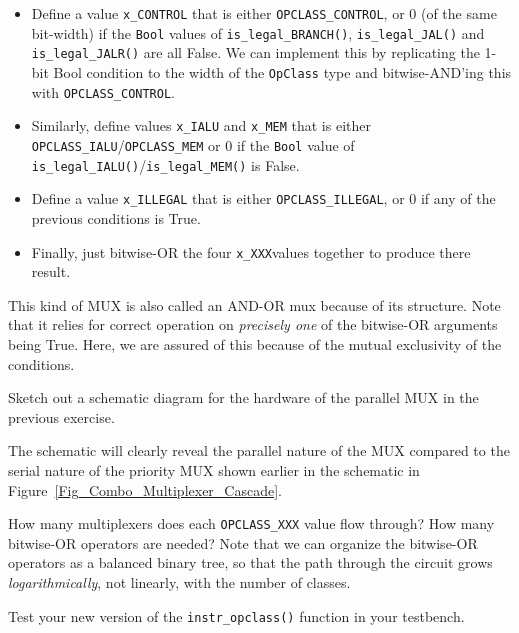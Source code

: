   \begin{itemize}

    \item Define a value \verb|x_CONTROL| that is either
      \verb|OPCLASS_CONTROL|, or 0 (of the same bit-width) if the
      \verb|Bool| values of \verb|is_legal_BRANCH()|,
      \verb|is_legal_JAL()| and \verb|is_legal_JALR()| are all False.
      We can implement this by replicating the 1-bit Bool condition to
      the width of the \verb|OpClass| type and bitwise-AND'ing this
      with \verb|OPCLASS_CONTROL|.

    \item Similarly, define values \verb|x_IALU| and \verb|x_MEM| that
       is either \verb|OPCLASS_IALU|/\verb|OPCLASS_MEM| or 0 if the
       \verb|Bool| value of
       \verb|is_legal_IALU()|/\verb|is_legal_MEM()| is False.

    \item Define a value \verb|x_ILLEGAL| that is either
      \verb|OPCLASS_ILLEGAL|, or 0 if any of
      the previous conditions is True.

    \item Finally, just bitwise-OR the four \verb|x_XXX|values
      together to produce there result.

  \end{itemize}

  This kind of MUX is also called an AND-OR mux because of its
  structure.  Note that it relies for correct operation on
  \emph{precisely one} of the bitwise-OR arguments being True.  Here,
  we are assured of this because of the mutual exclusivity of the
  conditions.

\Exercise

Sketch out a schematic diagram for the hardware of the parallel MUX in
the previous exercise.

The schematic will clearly reveal the parallel nature of the MUX
compared to the serial nature of the priority MUX shown earlier in the
schematic in Figure~\ref{Fig_Combo_Multiplexer_Cascade}.

How many multiplexers does each \verb|OPCLASS_XXX| value flow through?
How many bitwise-OR operators are needed?  Note that we can organize
the bitwise-OR operators as a balanced binary tree, so that the path
through the circuit grows \emph{logarithmically}, not linearly, with
the number of classes.

\Exercise

Test your new version of the \verb|instr_opclass()| function in your
testbench.


